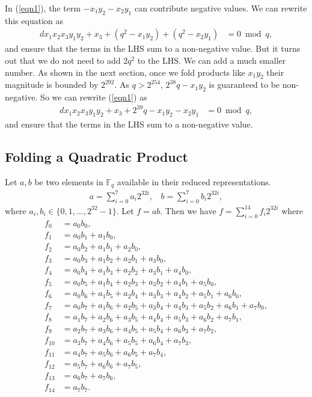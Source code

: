 \documentclass[a4paper, 12pt]{article}
\begin{document}
In (\ref{eqn1}), the term $-x_1y_2-x_2y_1$ can contribute negative values. We can rewrite this equation as
\begin{align}
  dx_1x_2x_3y_1y_2 + x_3 +(q^2 - x_1y_2) + (q^2 - x_2y_1) &= 0 \bmod q,\label{eqn4}
\end{align}
and ensure that the terms in the LHS sum to a non-negative value. But it turns out that we do not need to add $2q^2$ to the LHS. We can add a much smaller number. As shown in the next section, once we fold products like $x_1y_2$ their magnitude is bounded by $2^{292}$. As $q > 2^{254}$, $2^{38}q - x_1y_2$ is guaranteed to be non-negative. So we can rewrite (\ref{eqn1}) as 
\begin{align}
  dx_1x_2x_3y_1y_2 + x_3 + 2^{39}q - x_1y_2 - x_2y_1  &= 0 \bmod q,\label{eqn5}
\end{align}
and ensure that the terms in the LHS sum to a non-negative value.

\subsection{Folding a Quadratic Product}%
\label{subsec:folding_a_quadratic_product}
Let $a,b$ be two elements in $\mathbb{F}_q$ available in their reduced representations.
\begin{align*}
  a = \sum^{7}_{i=0} a_i 2^{32i}, \ \ \ \ b = \sum^{7}_{i=0} b_i 2^{32i},
\end{align*}
where $a_i, b_i \in \{0,1,\ldots,2^{32}-1\}$.
Let $f = ab$. Then we have $f = \sum_{i=0}^{14} f_i 2^{32i}$ where
\begin{align*}
  f_0 & = a_0b_0,\\
  f_1 & = a_0b_1 + a_1b_0,\\
  f_2 & = a_0b_2 + a_1b_1 + a_2b_0,\\
  f_3 & = a_0b_3 + a_1b_2 + a_2b_1 + a_3b_0,\\
  f_4 & = a_0b_4 + a_1b_3 + a_2b_2 + a_3b_1 + a_4b_0,\\
  f_5 & = a_0b_5 + a_1b_4 + a_2b_3 + a_3b_2 + a_4b_1 + a_5b_0,\\
  f_6 & = a_0b_6 + a_1b_5 + a_2b_4 + a_3b_3 + a_4b_2 + a_5b_1 + a_6b_0,\\
  f_7 & = a_0b_7 + a_1b_6 + a_2b_5 + a_3b_4 + a_4b_3 + a_5b_2 + a_6b_1 + a_7b_0,\\
  f_8 & = a_1b_7 + a_2b_6 + a_3b_5 + a_4b_4 + a_5b_3 + a_6b_2 + a_7b_1,\\
  f_9 & = a_2b_7 + a_3b_6 + a_4b_5 + a_5b_4 + a_6b_3 + a_7b_2,\\
  f_{10} & = a_3b_7 + a_4b_6 + a_5b_5 + a_6b_4 + a_7b_3,\\
  f_{11} & = a_4b_7 + a_5b_6 + a_6b_5 + a_7b_4,\\
  f_{12} & = a_5b_7 + a_6b_6 + a_7b_5,\\
  f_{13} & = a_6b_7 + a_7b_6,\\
  f_{14} & = a_7b_7.
\end{align*}
\end{document}
